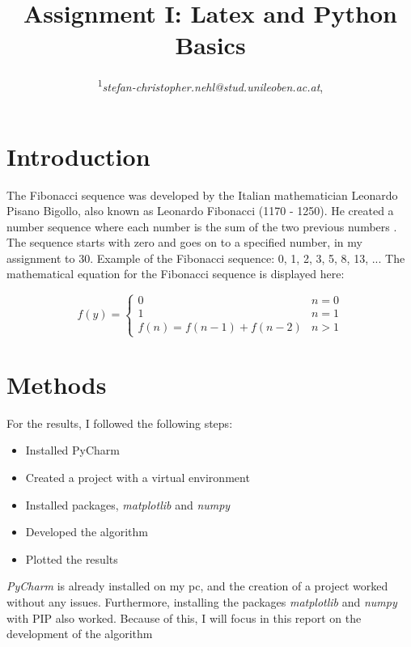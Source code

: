 \documentclass[10pt, a4paper, twocolumn]{article} %
\title{Assignment I: Latex and Python Basics} %
\author{
	\coursetitle{Exercises in Machine Learning (190.013), SS2022}
	\authorstyle{Stefan Nehl\textsuperscript{1}} %
	\newline\newline %
	\textsuperscript{1}\textit{stefan-christopher.nehl@stud.unileoben.ac.at}, \institution{Montanuniversität Leoben, Austria}\\ %
	\newline\submissiondate{\today} %
}
\begin{document}

\maketitle %

\thispagestyle{firstpage} %




\section{Introduction}
The Fibonacci sequence was developed by the Italian mathematician Leonardo Pisano Bigollo, also known as Leonardo Fibonacci (1170 - 1250). He created a number sequence where each number is the sum of the two previous numbers \citep{canaan2011all}. The sequence starts with zero and goes on to a specified number, in my assignment to 30. Example of the Fibonacci sequence: 0, 1, 2, 3, 5, 8, 13, ...
The mathematical equation for the Fibonacci sequence is displayed here: 

\[
 f(y) =
\begin{cases}
	0 & {n = 0}\\
  	1 & {n = 1}\\
  	f(n) = f(n-1) + f(n-2) & n > 1
\end{cases}
\]
\citep{canaan2011all}

\section{Methods}
For the results, I followed the following steps: 

\begin{itemize}
	\item Installed PyCharm
	\item Created a project with a virtual environment 
	\item Installed packages, \textit{matplotlib} and \textit{numpy}
	\item Developed the algorithm
	\item Plotted the results
\end{itemize}
\textit{PyCharm} is already installed on my pc, and the creation of a project worked without any issues.   Furthermore, installing the packages \textit{matplotlib} and \textit{numpy} with PIP also worked. Because of this, I will focus in this report on the development of the algorithm
\end{document}
